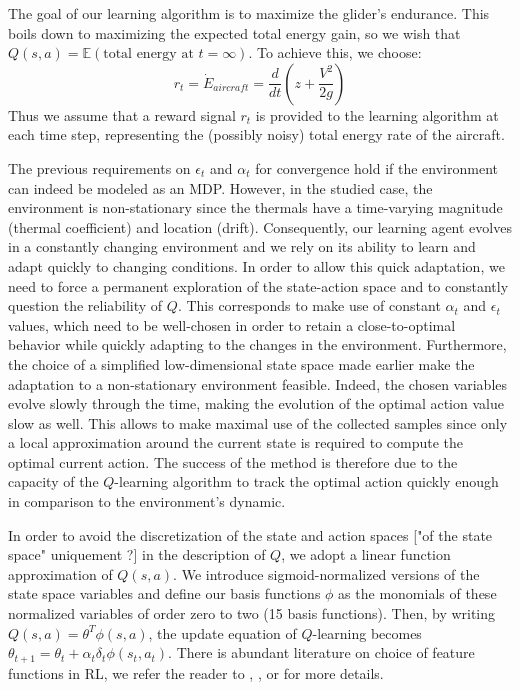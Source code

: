 \documentclass[a4paper, 10pt, conference]{ieeeconf}
\begin{document}
The goal of our learning algorithm is to maximize the glider's endurance. This boils down to maximizing the expected total energy gain, so we wish that $Q(s,a)=\mathbb{E}\left(\textrm{total energy at }t=\infty\right)$. To achieve this, we choose:
\begin{equation}
r_{t} = \dot{E}_{aircraft} = \frac{d}{dt} \left( z + \frac{V^2}{2g}\right)
\end{equation}
Thus we assume that a reward signal $r_t$ is provided to the learning algorithm at each time step, representing the (possibly noisy) total energy rate of the aircraft.

The previous requirements on $\epsilon_t$ and $\alpha_t$ for convergence hold if the environment can indeed be modeled as an MDP.
{\color{red}However, in the studied case, the environment is non-stationary since the thermals have a time-varying magnitude (thermal coefficient) and location (drift).}
Consequently, our learning agent evolves in a constantly changing environment and we rely on its ability to learn and adapt quickly to changing conditions. In order to allow this quick adaptation, we need to force a permanent exploration of the state-action space and to constantly question the reliability of $Q$. This corresponds to make use of constant $\alpha_t$ and $\epsilon_t$ values, which need to be well-chosen in order to retain a close-to-optimal behavior while quickly adapting to the changes in the environment.
{\color{red}Furthermore, the choice of a simplified low-dimensional state space made earlier make the adaptation to a non-stationary environment feasible. Indeed, the chosen variables evolve slowly through the time, making the evolution of the optimal action value slow as well. This allows to make maximal use	of the collected samples since only a local approximation around the current state is required to compute the optimal current action. The success of the method is therefore due to the capacity of the $Q$-learning algorithm to track the optimal action quickly enough in comparison to the environment's dynamic.}

In order to avoid the discretization of the state and action spaces {\color{red}["of the state space" uniquement ?]} in the description of $Q$, we adopt a linear function approximation of $Q(s,a)$. We introduce sigmoid-normalized versions of the state space variables and define our basis functions $\phi$ as the monomials of these normalized variables of order zero to two (15 basis functions). Then, by writing $Q(s,a)=\theta^T \phi(s,a)$, the update equation of $Q$-learning becomes $\theta_{t+1}=\theta_t + \alpha_t\delta_t\phi(s_t,a_t)$. 
There is abundant literature on choice of feature functions in RL, we refer the reader to \cite{parr08}, \cite{hachiya10}, or \cite{nguyen13} for more details.
\end{document}
